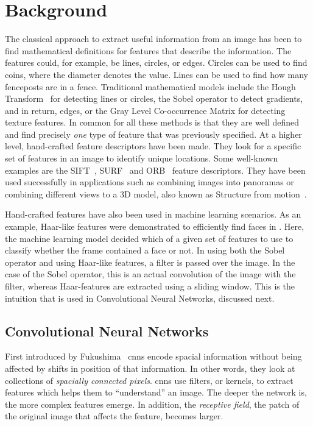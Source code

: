 \chapter{Background}

The classical approach to extract useful information from an image has been to find mathematical definitions for features that describe the information. The features could, for example, be lines, circles, or edges. 
Circles can be used to find coins, where the diameter denotes the value. Lines can be used to find how many fenceposts are in a fence. Traditional mathematical models include the Hough Transform~\cite{houghTransform} for detecting lines or circles, the Sobel operator to detect gradients, and in return, edges, or the Gray Level Co-occurrence Matrix for detecting texture features. 
In common for all these methods is that they are well defined and find precisely \emph{one} type of feature that was previously specified. 
At a higher level, hand-crafted feature descriptors have been made. They look for a specific set of features in an image to identify unique locations. Some well-known examples are the SIFT~\cite{sift1999Lowe}, SURF~\cite{surf2006Bay} and ORB~\cite{orb2011Rublee} feature descriptors. They have been used successfully in applications such as combining images into panoramas or combining different views to a 3D model, also known as Structure from motion~\cite{sfm1979ullman}.

Hand-crafted features have also been used in machine learning scenarios. As an example, Haar-like features were demonstrated to efficiently find faces in \cite{haarcascade}. Here, the machine learning model decided which of a given set of features to use to classify whether the frame contained a face or not. In using both the Sobel operator and using Haar-like features, a filter is passed over the image. In the case of the Sobel operator, this is an actual convolution of the image with the filter, whereas Haar-features are extracted using a sliding window. This is the intuition that is used in Convolutional Neural Networks, discussed next.

\section{Convolutional Neural Networks}\label{sec:background_cnn}
First introduced by Fukushima~\cite{Fukushima1980} \gls{cnn}s encode spacial information without being affected by shifts in position of that information. In other words, they look at collections of \emph{spacially connected pixels}. \gls{cnn}s use filters, or kernels, to extract features which helps them to ``understand'' an image. The deeper the network is, the more complex features emerge. In addition, the \emph{receptive field}, the patch of the original image that affects the feature, becomes larger. 

